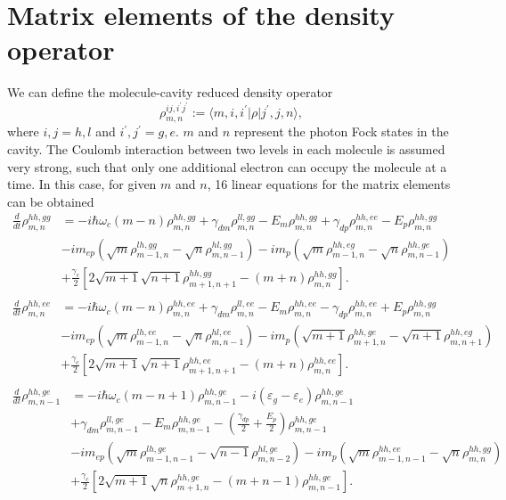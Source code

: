 \documentclass[aps,prb,
superscriptaddress,
,floatfix,footinbib,longbibliography,
preprint
]{revtex4-2}
\begin{document}
\section{Matrix elements of the density operator}
\label{matrix}
We can define the molecule-cavity reduced density operator
\begin{equation}
\rho_{m,n}^{ij,i^{\prime}j^{\prime}}:=\langle m,i,i^{\prime}|\rho|j^{\prime},j,n \rangle,
\end{equation}
where $i,j=h,l$ and $i^{\prime},j^{\prime}=g,e$. $m$ and $n$ represent the photon Fock states in the cavity. The Coulomb interaction
between two levels in each molecule is assumed very strong, such that only one additional electron can
 occupy the molecule at a time. In this case, for given $m$ and $n$, 16 linear equations for the matrix elements can be obtained
\begin{equation}
\begin{split}
\frac{d}{dt}\rho_{m,n}^{hh,gg}&=-i\hbar\omega_{c}(m-n)\rho_{m,n}^{hh,gg}+\gamma_{dm}\rho_{m,n}^{ll,gg}
-E_{m}\rho_{m,n}^{hh,gg}
+\gamma_{dp}\rho_{m,n}^{hh,ee}-E_{p}\rho_{m,n}^{hh,gg}\\
&-im_{ep}(\sqrt{m}\rho_{m-1,n}^{lh,gg}-\sqrt{n}\rho_{m,n-1}^{hl,gg})
-im_{p}(\sqrt{m}\rho_{m-1,n}^{hh,eg}-\sqrt{n}\rho_{m,n-1}^{hh,ge})\\
&+\frac{\gamma_{c}}{2}[2\sqrt{m+1}\sqrt{n+1}\rho_{m+1,n+1}^{hh,gg}-(m+n)\rho_{m,n}^{hh,gg}].\\
\end{split}
\label{hh,gg}
\end{equation}
%
\begin{equation}
\begin{split}
\frac{d}{dt}\rho_{m,n}^{hh,ee}&=-i\hbar\omega_{c}(m-n)\rho_{m,n}^{hh,ee}+\gamma_{dm}\rho_{m,n}^{ll,ee}
-E_{m}\rho_{m,n}^{hh,ee}-\gamma_{dp}\rho_{m,n}^{hh,ee}+E_{p}\rho_{m,n}^{hh,gg}\\
&-im_{ep}(\sqrt{m}\rho_{m-1,n}^{lh,ee}-\sqrt{n}\rho_{m,n-1}^{hl,ee})
-im_{p}(\sqrt{m+1}\rho_{m+1,n}^{hh,ge}-\sqrt{n+1}\rho_{m,n+1}^{hh,eg})\\
&+\frac{\gamma_{c}}{2}[2\sqrt{m+1}\sqrt{n+1}\rho_{m+1,n+1}^{hh,ee}-(m+n)\rho_{m,n}^{hh,ee}].\\
\end{split}
\label{hh,ee}
\end{equation}
%
\begin{equation}
\begin{split}
\frac{d}{dt}\rho_{m,n-1}^{hh,ge}&=-i\hbar\omega_{c}(m-n+1)\rho_{m,n-1}^{hh,ge}
-i(\varepsilon_{g}-\varepsilon_{e})\rho_{m,n-1}^{hh,ge}\\
&+\gamma_{dm}\rho_{m,n-1}^{ll,ge}
-E_{m}\rho_{m,n-1}^{hh,ge}-(\frac{\gamma_{dp}}{2}+\frac{E_{p}}{2})\rho_{m,n-1}^{hh,ge}\\
&-im_{ep}(\sqrt{m}\rho_{m-1,n-1}^{lh,ge}-\sqrt{n-1}\rho_{m,n-2}^{hl,ge})
-im_{p}(\sqrt{m}\rho_{m-1,n-1}^{hh,ee}-\sqrt{n}\rho_{m,n}^{hh,gg})\\
&+\frac{\gamma_{c}}{2}[2\sqrt{m+1}\sqrt{n}\rho_{m+1,n}^{hh,ge}-(m+n-1)\rho_{m,n-1}^{hh,ge}].\\
\end{split}
\label{hh,ge}
\end{equation}
\end{document}
